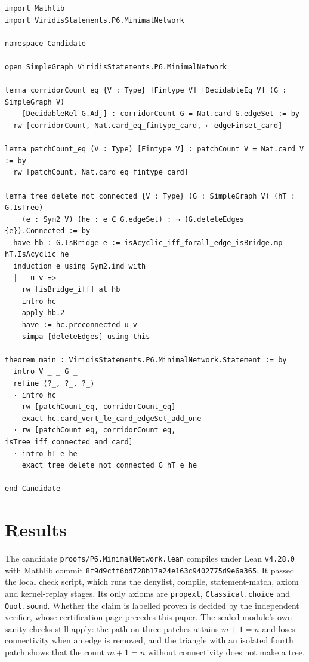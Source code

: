 \documentclass[11pt]{article}
\begin{document}
\begin{lstlisting}
import Mathlib
import ViridisStatements.P6.MinimalNetwork

namespace Candidate

open SimpleGraph ViridisStatements.P6.MinimalNetwork

lemma corridorCount_eq {V : Type} [Fintype V] [DecidableEq V] (G : SimpleGraph V)
    [DecidableRel G.Adj] : corridorCount G = Nat.card G.edgeSet := by
  rw [corridorCount, Nat.card_eq_fintype_card, ← edgeFinset_card]

lemma patchCount_eq (V : Type) [Fintype V] : patchCount V = Nat.card V := by
  rw [patchCount, Nat.card_eq_fintype_card]

lemma tree_delete_not_connected {V : Type} (G : SimpleGraph V) (hT : G.IsTree)
    (e : Sym2 V) (he : e ∈ G.edgeSet) : ¬ (G.deleteEdges {e}).Connected := by
  have hb : G.IsBridge e := isAcyclic_iff_forall_edge_isBridge.mp hT.IsAcyclic he
  induction e using Sym2.ind with
  | _ u v =>
    rw [isBridge_iff] at hb
    intro hc
    apply hb.2
    have := hc.preconnected u v
    simpa [deleteEdges] using this

theorem main : ViridisStatements.P6.MinimalNetwork.Statement := by
  intro V _ _ G _
  refine ⟨?_, ?_, ?_⟩
  · intro hc
    rw [patchCount_eq, corridorCount_eq]
    exact hc.card_vert_le_card_edgeSet_add_one
  · rw [patchCount_eq, corridorCount_eq, isTree_iff_connected_and_card]
  · intro hT e he
    exact tree_delete_not_connected G hT e he

end Candidate
\end{lstlisting}

\section{Results}
The candidate \texttt{proofs/P6.MinimalNetwork.lean} compiles under Lean \texttt{v4.28.0} with Mathlib
commit \texttt{8f9d9cff6bd728b17a24e163c9402775d9e6a365}. It passed the local check script, which
runs the denylist, compile, statement-match, axiom and kernel-replay stages. Its only axioms are
\texttt{propext}, \texttt{Classical.choice} and \texttt{Quot.sound}. Whether the claim is labelled
proven is decided by the independent verifier, whose certification page precedes this paper. The sealed
module's own sanity checks still apply: the path on three patches attains $m+1=n$ and loses
connectivity when an edge is removed, and the triangle with an isolated fourth patch shows that the count
$m+1=n$ without connectivity does not make a tree.
\end{document}
